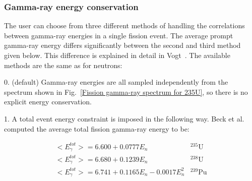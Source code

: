 \subsubsection*{Gamma-ray energy conservation}

The user can choose from three different methods of handling the
correlations between gamma-ray energies in a single fission event.
The average prompt gamma-ray energy differs significantly between the second and 
third method given below. This difference is explained in detail in Vogt~\cite{Vogt 2008}.
The available methods are the same as for neutrons:

\begin{list}{}
\item 0.  (default) Gamma-ray 
energies are all sampled independently from the spectrum shown in 
Fig.~\ref{Fission gamma-ray spectrum for 235U}, so there is no explicit 
energy conservation.
\item 1.  A total event energy 
constraint is imposed in the following way. Beck et 
al.~\cite{Beck 2007} computed the average total fission gamma-ray 
energy to be:

\begin{equation}
\begin{array}{ll}
<E^{tot}_{\gamma}> = 6.600+0.0777E_n & ^{235}\mathrm{U}\\
<E^{tot}_{\gamma}> = 6.680+0.1239E_n & ^{238}\mathrm{U}\\
<E^{tot}_{\gamma}> = 6.741+0.1165E_n-0.0017E_n^2 & ^{239}\mathrm{Pu}\\
\end{array}
\label{eq:total gamma-ray energy, Beck}
\end{equation}


\end{list}

